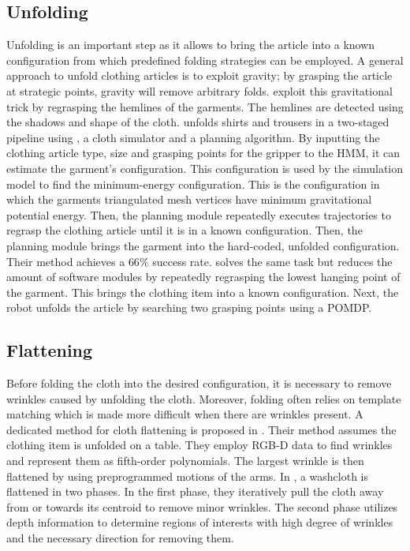 \subsection{Unfolding}
Unfolding is an important step as it allows to bring the article into a known configuration from which predefined folding strategies can be employed. A general approach to unfold clothing articles is to exploit gravity; by grasping the article at strategic points, gravity will remove arbitrary folds. \Textcite{Hamajima1998} exploit this gravitational trick by regrasping the hemlines of the garments. The hemlines are detected using the shadows and shape of the cloth. \textcite{Cusumano2011} unfolds shirts and trousers in a two-staged pipeline using , a cloth simulator and a planning algorithm. By inputting the clothing article type, size and grasping points for the gripper to the \acrshort{HMM}, it can estimate the garment's configuration. This configuration is used by the simulation model to find the minimum-energy configuration. This is the configuration in which the garments triangulated mesh vertices have minimum gravitational potential energy. Then, the planning module repeatedly executes trajectories to regrasp the clothing article until it is in a known configuration. Then, the planning module brings the garment into the hard-coded, unfolded configuration. Their method achieves a $66\%$ success rate. \textcite{Doumanoglou2014} solves the same task but reduces the amount of software modules by repeatedly regrasping the lowest hanging point of the garment. This brings the clothing item into a known configuration. Next, the robot unfolds the article by searching two grasping points using a \acrshort{POMDP}.

\subsection{Flattening}
Before folding the cloth into the desired configuration, it is necessary to remove wrinkles caused by unfolding the cloth. Moreover, folding often relies on template matching which is made more difficult when there are wrinkles present. A dedicated method for cloth flattening is proposed in \autocite{Sun2015}. Their method assumes the clothing item is unfolded on a table. They employ RGB-D data to find wrinkles and represent them as fifth-order polynomials. The largest wrinkle is then flattened by using preprogrammed motions of the arms. In \autocite{Willimon2011}, a washcloth is flattened in two phases. In the first phase, they iteratively pull the cloth away from or towards its centroid to remove minor wrinkles. The second phase utilizes depth information to determine regions of interests with high degree of wrinkles and the necessary direction for removing them.


